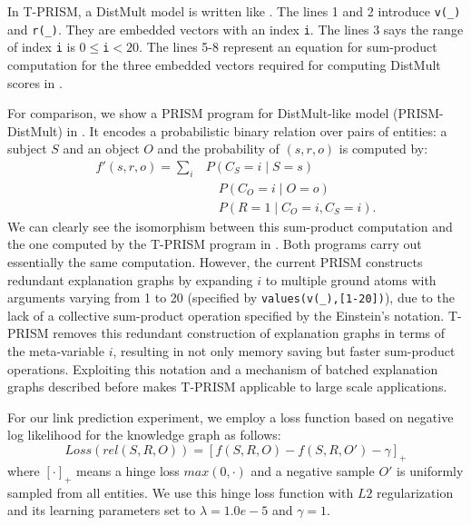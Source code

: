 \documentclass[a4paper]{report}
\begin{document}
In      T-PRISM,      a       DistMult      model      is      written
like   .     The   lines   1    and   2
introduce \verb|v(_)| and \verb|r(_)|.  They are embedded vectors with
an index  \verb|i|. The lines  3 says the  range of index  \verb|i| is
$0  \leq $\verb|i|$<  20$.  The  lines 5-8  represent an  equation for
sum-product computation  for the  three embedded vectors  required for
computing DistMult scores in .



For  comparison, we  show  a PRISM  program  for DistMult-like  model
(PRISM-DistMult)
in  \cite{kojima2018ijar}.  It encodes a
probabilistic binary  relation over pairs  of entities: a  subject $S$
and an object $O$ and the probability of $(s,r,o)$ is computed by:
\begin{align}\nonumber
f'(s,r,o)=\sum_i & P(C_S=i \mid S=s) \\ \nonumber
&\hspace{1em} P(C_O=i \mid O=o) \\
&\hspace{1em} P(R=1 \mid C_O=i, C_S=i).
\label{eq:prism-distmult}
\end{align}
%
We can clearly see the isomorphism between this sum-product computation and the
one computed by the T-PRISM program in
.
Both programs carry out essentially the same computation. However, the
current PRISM constructs redundant explanation graphs by expanding $i$
to  multiple  ground  atoms  with  arguments  varying  from  1  to  20
(specified  by  {\tt values(v(\_),[1-20])}),  due  to  the lack  of  a
collective sum-product operation specified by the Einstein's notation.
T-PRISM removes  this redundant construction of  explanation graphs in
terms of  the meta-variable $i$,  resulting in not only  memory saving
but  faster sum-product  operations.  Exploiting  this notation  and a
mechanism of batched explanation graphs described before makes T-PRISM
applicable to large scale applications.



For our link prediction experiment, we employ a loss function based on
negative log likelihood for the knowledge graph as follows:
%
\[Loss(rel(S,R,O)) = \left[ f(S, R, O) - f(S, R, O') -\gamma \right]_{+}\]
%
where $[\cdot]_{+}$ means  a hinge loss $max(0,\cdot)$  and a negative
sample  $O'$ is  uniformly sampled  from all  entities.  We  use this
hinge  loss  function  with   $L2$  regularization  and  its  learning
parameters set to $\lambda=1.0e-5$ and $\gamma=1$.
\end{document}
